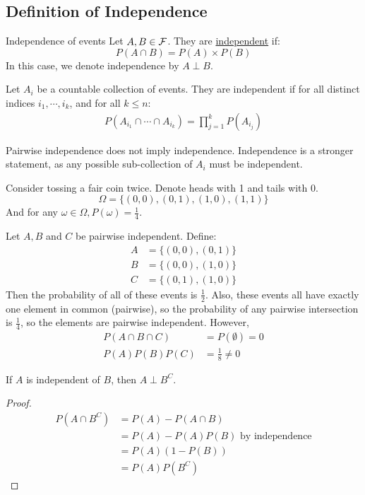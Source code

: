 \documentclass[../Main.tex]{subfiles}
\begin{document}
\subsection{Definition of Independence}
\begin{definition}{Independence of events}
    Let $A, B \in \mathcal{F}$. They are \underline{independent} if:
    \begin{equation*}
        P(A \cap B) = P(A) \times P(B)
    \end{equation*}
    In this case, we denote independence by $A \perp B$.
\end{definition}
Let $A_i$ be a countable collection of events. They are independent if for all distinct indices $i_1, \cdots, i_k$, and for all $k \leq n$:
\begin{align*}
    P(A_{i_1} \cap \cdots \cap A_{i_k}) = \prod_{j=1}^{k} P(A_{i_j})
\end{align*}
\begin{warning}
    Pairwise independence does not imply independence. Independence is a stronger statement, as any possible sub-collection of $A_i$ must be independent.
\end{warning}
\begin{example}
    Consider tossing a fair coin twice. Denote heads with 1 and tails with 0.
    \begin{equation*}
        \Omega = \{(0, 0), (0, 1), (1, 0), (1, 1)\}
    \end{equation*}
    And for any $\omega \in \Omega, P(\omega) = \frac{1}{4}$.\par
    Let $A, B$ and $C$ be pairwise independent. Define:
    \begin{align*}
        A &= \{(0, 0), (0, 1)\} \\
        B &= \{(0, 0), (1, 0)\} \\
        C &= \{(0, 1), (1, 0)\}
    \end{align*}
    Then the probability of all of these events is $\frac{1}{2}$. Also, these events all have exactly one element in common (pairwise), so the probability of any pairwise intersection is $\frac{1}{4}$, so the elements are pairwise independent. However,
    \begin{align*}
        P(A \cap B \cap C) &= P(\emptyset) = 0 \\
        P(A)P(B)P(C) &= \frac{1}{8} \neq 0
    \end{align*}
\end{example}
\begin{proposition}
    If $A$ is independent of $B$, then $A \perp B^C$.
    \label{propIndependentComplement}
\end{proposition}
\begin{proof}
    \begin{align*}
        P(A \cap B^C) &= P(A) - P(A \cap B) \\
        &= P(A) - P(A)P(B) \text{ by independence} \\
        &= P(A) (1 - P(B)) \\
        &= P(A) P(B^C)
    \end{align*}
\end{proof}
\end{document}
